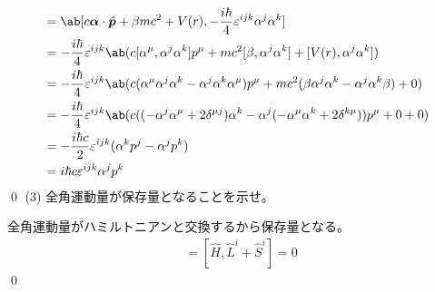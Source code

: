 \documentclass[uplatex,dvipdfmx,a4paper,11pt]{jlreq}
\makeatletter
\newcommand{\pp}{\bm{p}}
\numberwithin{equation}{section}
\theoremstyle{definition}
\renewenvironment{proof}[1][\proofname]{\par
  \normalfont
  \topsep6\p@\@plus6\p@ \trivlist
  \item[\hskip\labelsep{\bfseries #1}\@addpunct{\bfseries}]\ignorespaces\quad\par
}{%
  \qed\endtrivlist\@endpefalse
}
\renewcommand\proofname{証明}
\makeatother
\begin{document}
\begin{proof}
  \begin{align}
    [\hat{H}, \hat{S}^i] & = \ab[c\bm{\alpha}\cdot\hat{\pp} + \beta mc^2 + V(r), -\frac{i\hbar}{4}\varepsilon^{ijk}\alpha^j\alpha^k]                                                          \\
                         & = -\frac{i\hbar}{4}\varepsilon^{ijk}\ab(c[\alpha^\mu, \alpha^j\alpha^k]p^\mu + mc^2[\beta, \alpha^j\alpha^k] + [V(r), \alpha^j\alpha^k])                           \\
                         & = -\frac{i\hbar}{4}\varepsilon^{ijk}\ab(c(\alpha^\mu\alpha^j\alpha^k - \alpha^j\alpha^k\alpha^\mu)p^\mu + mc^2(\beta\alpha^j\alpha^k - \alpha^j\alpha^k\beta) + 0) \\
                         & = -\frac{i\hbar}{4}\varepsilon^{ijk}\ab(c((-\alpha^j\alpha^\mu + 2\delta^{\mu j})\alpha^k - \alpha^j(-\alpha^\mu\alpha^k + 2\delta^{k\mu}))p^\mu + 0 + 0)          \\
                         & = -\frac{i\hbar c}{2}\varepsilon^{ijk}(\alpha^kp^j - \alpha^jp^k)                                                                                                  \\
                         & = i\hbar c\varepsilon^{ijk}\alpha^jp^k
  \end{align}
\end{proof}
(3) 全角運動量が保存量となることを示せ。
\begin{proof}
  全角運動量がハミルトニアンと交換するから保存量となる。
  \begin{align}
    [\hat{H}, \hat{J}^i] & = [\hat{H}, \hat{L}^i + \hat{S}^i] = 0
  \end{align}
\end{proof}
\end{document}
